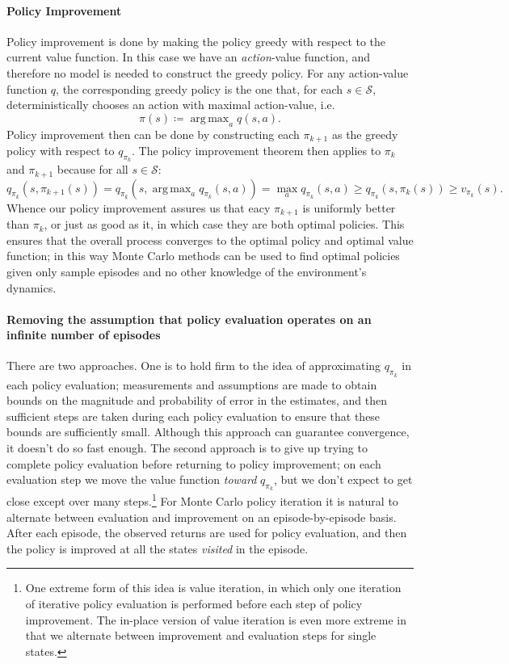 \documentclass[12pt]{article}
\DeclareMathOperator*{\argmax}{arg\,max}
\begin{document}
\paragraph{Policy Improvement} Policy improvement is done by making the policy greedy with respect to the current value function. In this case we have an \emph{action}-value function, and therefore no model is needed to construct the greedy policy. For any action-value function $q$, the corresponding greedy policy is the one that, for each $s \in \mathcal S$, deterministically chooses an action with maximal action-value, i.e.
\[
  \pi(s) \coloneqq \argmax_a q(s,a).
\]
Policy improvement then can be done by constructing each $\pi_{k+1}$ as the greedy policy with respect to $q_{\pi_k}$.
The policy improvement theorem then applies to $\pi_k$ and $\pi_{k+1}$ because for all $s \in \mathcal S$:
\[
  q_{\pi_k}(s, \pi_{k+1}(s)) = q_{\pi_k}(s, \argmax_a q_{\pi_k}(s,a)) = \max_a q_{\pi_k} (s,a) \geq q_{\pi_k}(s, \pi_k(s)) \geq v_{\pi_k}(s).
\]
Whence our policy improvement assures us that eacy $\pi_{k+1}$ is uniformly better than $\pi_k$, or just as good as it, in which case they are both optimal policies. This ensures that the overall process converges to the optimal policy and optimal value function; in this way Monte Carlo methods can be used to find optimal policies given only sample episodes and no other knowledge of the environment's dynamics.

\paragraph{Removing the assumption that policy evaluation operates on an infinite number of episodes} There are two approaches. One is to hold firm to the idea of approximating $q_{\pi_k}$ in each policy evaluation; measurements and assumptions are made to obtain bounds on the magnitude and probability of error in the estimates, and then sufficient steps are taken during each policy evaluation to ensure that these bounds are sufficiently small. Although this approach can guarantee convergence, it doesn't do so fast enough. The second approach is to give up trying to complete policy evaluation before returning to policy improvement; on each evaluation step we move the value function \emph{toward} $q_{\pi_k}$, but we don't expect to get close except over many steps.\footnote{One extreme form of this idea is value iteration, in which only one iteration of iterative policy evaluation is performed before each step of policy improvement. The in-place version of value iteration is even more extreme in that we alternate between improvement and evaluation steps for single states.} For Monte Carlo policy iteration it is natural to alternate between evaluation and improvement on an episode-by-episode basis. After each episode, the observed returns are used for policy evaluation, and then the policy is improved at all the states \emph{visited} in the episode.
\end{document}
